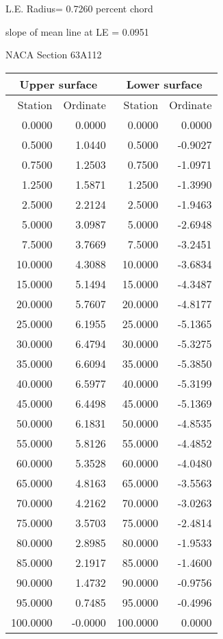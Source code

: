 \documentclass[11pt]{book}
\begin{document}
L.E. Radius=  0.7260 percent chord


 slope of mean line at LE =  0.0951
 \newpage
  \label{s63A112}
 \begin{Large}
 NACA Section 63A112
 \end{Large}
  
 \vspace{8mm}
 \begin{tabular}{|r|r|r|r|} \hline 
 \multicolumn{2}{|c|}{Upper surface} & \multicolumn{2}{|c|}{Lower surface} \\
 \hline
 Station & Ordinate & Station & Ordinate \\
 \hline
0.0000 & 0.0000 & 0.0000 & 0.0000 \\
0.5000 & 1.0440 & 0.5000 & -0.9027 \\
0.7500 & 1.2503 & 0.7500 & -1.0971 \\
1.2500 & 1.5871 & 1.2500 & -1.3990 \\
2.5000 & 2.2124 & 2.5000 & -1.9463 \\
5.0000 & 3.0987 & 5.0000 & -2.6948 \\
7.5000 & 3.7669 & 7.5000 & -3.2451 \\
10.0000 & 4.3088 & 10.0000 & -3.6834 \\
15.0000 & 5.1494 & 15.0000 & -4.3487 \\
20.0000 & 5.7607 & 20.0000 & -4.8177 \\
25.0000 & 6.1955 & 25.0000 & -5.1365 \\
30.0000 & 6.4794 & 30.0000 & -5.3275 \\
35.0000 & 6.6094 & 35.0000 & -5.3850 \\
40.0000 & 6.5977 & 40.0000 & -5.3199 \\
45.0000 & 6.4498 & 45.0000 & -5.1369 \\
50.0000 & 6.1831 & 50.0000 & -4.8535 \\
55.0000 & 5.8126 & 55.0000 & -4.4852 \\
60.0000 & 5.3528 & 60.0000 & -4.0480 \\
65.0000 & 4.8163 & 65.0000 & -3.5563 \\
70.0000 & 4.2162 & 70.0000 & -3.0263 \\
75.0000 & 3.5703 & 75.0000 & -2.4814 \\
80.0000 & 2.8985 & 80.0000 & -1.9533 \\
85.0000 & 2.1917 & 85.0000 & -1.4600 \\
90.0000 & 1.4732 & 90.0000 & -0.9756 \\
95.0000 & 0.7485 & 95.0000 & -0.4996 \\
100.0000 & -0.0000 & 100.0000 & 0.0000 \\
 \hline 
 \end{tabular}
\end{document}
